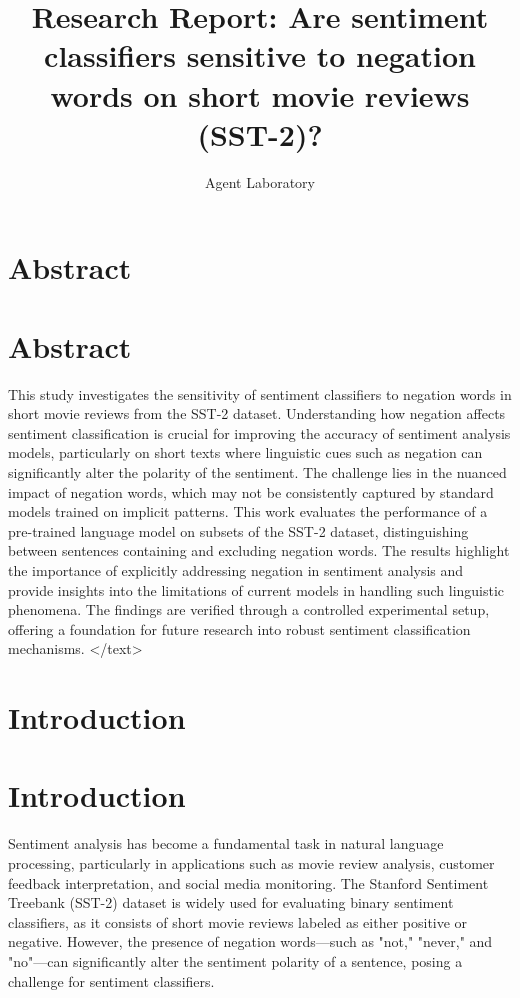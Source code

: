 \documentclass{article}
\title{Research Report: Are sentiment classifiers sensitive to negation words on short movie reviews (SST-2)?}
\author{Agent Laboratory}
\begin{document}
\maketitle
\section{Abstract}
\section*{Abstract}
This study investigates the sensitivity of sentiment classifiers to negation words in short movie reviews from the SST-2 dataset. Understanding how negation affects sentiment classification is crucial for improving the accuracy of sentiment analysis models, particularly on short texts where linguistic cues such as negation can significantly alter the polarity of the sentiment. The challenge lies in the nuanced impact of negation words, which may not be consistently captured by standard models trained on implicit patterns. This work evaluates the performance of a pre-trained language model on subsets of the SST-2 dataset, distinguishing between sentences containing and excluding negation words. The results highlight the importance of explicitly addressing negation in sentiment analysis and provide insights into the limitations of current models in handling such linguistic phenomena. The findings are verified through a controlled experimental setup, offering a foundation for future research into robust sentiment classification mechanisms.
</text>
\section{Introduction}
\section{Introduction}

Sentiment analysis has become a fundamental task in natural language processing, particularly in applications such as movie review analysis, customer feedback interpretation, and social media monitoring. The Stanford Sentiment Treebank (SST-2) dataset is widely used for evaluating binary sentiment classifiers, as it consists of short movie reviews labeled as either positive or negative. However, the presence of negation words—such as "not," "never," and "no"—can significantly alter the sentiment polarity of a sentence, posing a challenge for sentiment classifiers. 
\end{document}
